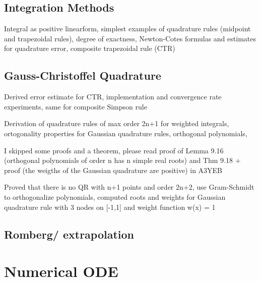 \documentclass{article}
\theoremstyle{remark}
\begin{document}
\subsection{Integration Methods}%
\label{sub:trapezoid_rule}
\begin{tcolorbox}
  Integral as positive linearform, simplest examples of  quadrature rules (midpoint and trapezoidal rules), degree of exactness, Newton-Cotes formulas and estimates for quadrature error, composite trapezoidal rule (CTR)
\end{tcolorbox}

\subsection{Gauss-Christoffel Quadrature}%
\label{sub:gauss_christoffel_quadrature}
\begin{tcolorbox}
  Derived error estimate for CTR, implementation and convergence rate experiments, same for composite Simpson rule	
\end{tcolorbox}

\begin{tcolorbox}
  Derivation of quadrature rules of max order 2n+1 for weighted integrals, ortogonality properties for Gaussian quadrature rules, orthogonal polynomials,

I skipped some proofs and a theorem, please read proof of Lemma 9.16 (orthogonal polynomials of order n has n simple real roots)  and Thm 9.18 + proof (the weigths of the Gaussian quadrature are positive) in A3YEB
\end{tcolorbox}

\begin{tcolorbox}
  Proved that there is no QR with n+1 points and order 2n+2, use Gram-Schmidt to orthogonalize polynomials, computed roots and weights for Gaussian quadrature rule with 3 nodes on [-1,1] and weight function w(x) = 1


\end{tcolorbox}

\subsection{Romberg/ extrapolation}%
\label{sub:romberg_extrapolation}

\newpage
\section{Numerical ODE}%
\label{sec:numerical_ode}
\end{document}
